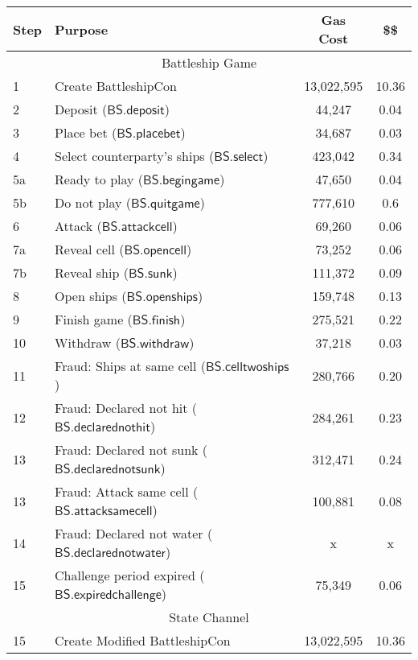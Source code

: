 \documentclass{llncs}
\newcommand{\battleshipattackcell}{\mathsf{BS.attackcell}}
\newcommand{\battleshipbegin}{\mathsf{BS.begingame}}
\newcommand{\battleshipquit}{\mathsf{BS.quitgame}}
\newcommand{\battleshipplacebet}{\mathsf{BS.placebet}}
\newcommand{\battleshipselectboard}{\mathsf{BS.select}}
\newcommand{\battleshiprevealcell}{\mathsf{BS.opencell}}
\newcommand{\battleshipsinking}{\mathsf{BS.sunk}}
\newcommand{\battleshiprevealboard}{\mathsf{BS.openships}}
\newcommand{\battleshipdeposit}{\mathsf{BS.deposit}}
\newcommand{\battleshipwithdraw}{\mathsf{BS.withdraw}}
\newcommand{\battleshipfinish}{\mathsf{BS.finish}}
\newcommand{\battleshipdeclarednotsunk}{\mathsf{BS.declarednotsunk}}
\newcommand{\battleshipdeclarednothit}{\mathsf{BS.declarednothit}}
\newcommand{\battleshipdeclarednotwater}{\mathsf{BS.declarednotwater}}
\newcommand{\battleshipsamecell}{\mathsf{BS.attacksamecell}}
\newcommand{\battleshiptwoships}{\mathsf{BS.celltwoships}}
\newcommand{\battleshipchallengeexpired}{\mathsf{BS.expiredchallenge}}
\begin{document}


\appendix


\begin{table}
	\centering
	\begin{tabular}[]{l l c c}
		
		\textbf{Step} & \textbf{Purpose} & \textbf{Gas Cost} & \textbf{\$\$}  \\ 
		\hline
		\multicolumn{4}{c}{Battleship Game} \\
		\hline
		1 & Create BattleshipCon & 13,022,595 & 10.36 \\
		2 & Deposit ($\battleshipdeposit$) & 44,247 & 0.04 \\
		3 & Place bet ($\battleshipplacebet$)& 34,687 & 0.03 \\
		4 & Select counterparty's ships ($\battleshipselectboard$) & 423,042 & 0.34 \\ 
		5a & Ready to play ($\battleshipbegin$) & 47,650 & 0.04 \\
		5b & Do not play ($\battleshipquit$) & 777,610 & 0.6 \\
		6 & Attack ($\battleshipattackcell$) & 69,260 & 0.06 \\
		7a & Reveal cell ($\battleshiprevealcell$) & 73,252 & 0.06 \\
		7b & Reveal ship ($\battleshipsinking$)& 111,372 & 0.09  \\
		8 & Open ships ($\battleshiprevealboard$) & 159,748 & 0.13 \\
		9 & Finish game ($\battleshipfinish$) & 275,521 & 0.22 \\
		10 & Withdraw ($\battleshipwithdraw$) & 37,218 &0.03 \\ 
		11 & Fraud: Ships at same cell ($\battleshiptwoships$) & 280,766 & 0.20\\
		12 & Fraud: Declared not hit ($\battleshipdeclarednothit$) & 284,261 & 0.23 \\
		13 & Fraud: Declared not sunk ($\battleshipdeclarednotsunk$) & 312,471 & 0.24 \\
		13 & Fraud: Attack same cell ($\battleshipsamecell$) & 100,881 & 0.08 \\
		14 & Fraud: Declared not water ($\battleshipdeclarednotwater$) & x & x \\
		15 & Challenge period expired ($\battleshipchallengeexpired$) &75,349 & 0.06 \\
		\hline
		\multicolumn{4}{c}{State Channel} \\
		\hline
		15 & Create Modified BattleshipCon & 13,022,595 & 10.36 \\

\end{tabular}
\end{table}
\end{document}
